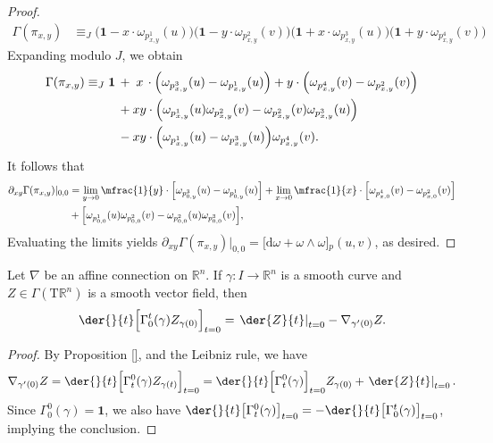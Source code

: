 \begin{proof}
\begin{align}
    \Gamma(\pi_{x, y}) &\equiv_J \Big(\mathbf{1} - x \cdot  \omega_{p^1_{x, y}}(u)\Big) \Big(\mathbf{1} - y \cdot  \omega_{p^2_{x, y}}(v)\Big) \Big(\mathbf{1} + x \cdot  \omega_{p^3_{x, y}}(u)\Big) \Big(\mathbf{1} + y \cdot  \omega_{p^4_{x, y}}(v)\Big)
  \end{align}
  Expanding modulo $J$, we obtain
  \begin{align}
    \Gamma(\pi_{x,y}) \equiv_J \mathbf{1} \mskip 3mu &+ \mskip 5mu x \mskip 3mu \cdot \Big(\omega_{p^3_{x,y}}(u) - \omega_{p^1_{x,y}}(u)\Big) + y \cdot \Big(\omega_{p^4_{x,y}}(v) - \omega_{p^2_{x,y}}(v)\Big) \nonumber \\
    &+ xy \cdot \Big( \omega_{p^1_{x,y}}(u)  \omega_{p^2_{x,y}}(v) - \omega_{p^2_{x,y}}(v)  \omega_{p^3_{x,y}}(u) \Big) \nonumber \\
    &- xy \cdot \Big(\omega_{p^1_{x,y}}(u)  - \omega_{p^3_{x,y}}(u) \Big) \omega_{p^{4}_{x,y}}(v).
  \end{align}
  It follows that
  \begin{align}
    \partial_{xy} \Gamma(\pi_{x,y})|_{0, 0} &= \lim_{y \to 0} \mfrac{1}{y} \cdot  \Big[ \omega_{p^3_{0,y}}(u) -  \omega_{p^1_{0,y}}(u) \Big] + \lim_{x \to 0} \mfrac{1}{x} \cdot \Big[ \omega_{p^4_{x,0}}(v) -  \omega_{p^2_{x,0}}(v) \Big] \nonumber \\
    &+ \Big[ \omega_{p^{1}_{0,0}}(u)\omega_{p^{2}_{0,0}}(v) -  \omega_{p^{2}_{0,0}}(u)\omega_{p^{3}_{0,0}}(v) \Big],
  \end{align}
  Evaluating the limits yields $\partial_{xy} \Gamma(\pi_{x,y})|_{0, 0} = \big[\mathrm{d}\omega + \omega \wedge \omega\big]{}_p(u, v)$, as desired. 
\end{proof}

\newpage 
\begin{theorem}
  Let $\nabla$ be an affine connection on $\mathbb{R}^n$. If $\gamma \colon I \to \mathbb{R}^n$ is a smooth curve and $Z \in \Gamma(\mathrm{T}\mathbb{R}^n)$ is a smooth vector field, then
  \begin{equation}
    \der{}{t} \Big[\Gamma_{0}^{t} (\gamma) Z_{\gamma(0)}\Big]_{t = 0} = \left.\der{Z}{t}\right|_{t = 0} - \nabla_{\gamma'(0)} Z.
  \end{equation}
\end{theorem}
\begin{proof}
By Proposition \ref{}, and the Leibniz rule, we have
\begin{equation}
  \nabla_{\gamma'(0)} Z = \der{}{t} \Big[\Gamma_t^0(\gamma) Z_{\gamma(t)} \Big]_{t = 0} = \der{}{t} \Big[\Gamma_t^0(\gamma)\Big]_{t = 0} Z_{\gamma(0)}  + \left.\der{Z}{t}\right|_{t = 0}.
\end{equation}
Since $\Gamma_0^0(\gamma) = \mathbf{1}$, we also have $\der{}{t}\big[\Gamma_t^0(\gamma)\big]_{t = 0} = -\der{}{t}\big[\Gamma_0^t(\gamma)\big]_{t = 0}$, implying the conclusion.
\end{proof}

